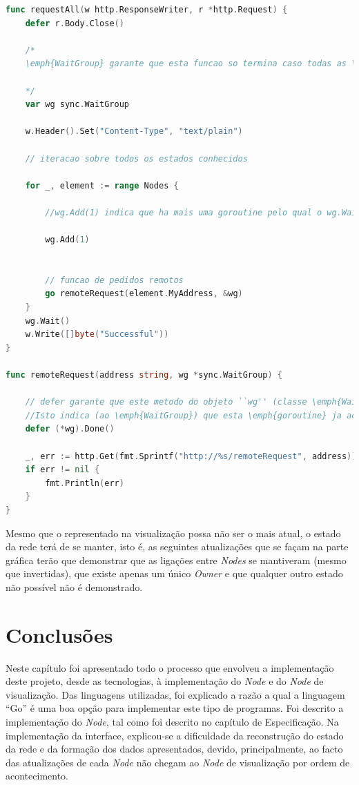 \begin{lstlisting}[caption={\emph{Handler} ``requestAll'' do método ``/requestAll''},language=Go]
func requestAll(w http.ResponseWriter, r *http.Request) {
	defer r.Body.Close()

	/* 
	\emph{WaitGroup} garante que esta funcao so termina caso todas as \emph{goroutines} terminem de executar.

	*/
	var wg sync.WaitGroup

	w.Header().Set("Content-Type", "text/plain")

	// iteracao sobre todos os estados conhecidos

	for _, element := range Nodes {

		//wg.Add(1) indica que ha mais uma goroutine pelo qual o wg.Wait() precisa de esperar

		wg.Add(1)


		// funcao de pedidos remotos
		go remoteRequest(element.MyAddress, &wg)
	}
	wg.Wait()
	w.Write([]byte("Successful"))
}

func remoteRequest(address string, wg *sync.WaitGroup) {

	// defer garante que este metodo do objeto ``wg'' (classe \emph{WaitGroup}) e executado
	//Isto indica (ao \emph{WaitGroup}) que esta \emph{goroutine} ja acabou a execucao
	defer (*wg).Done()

	_, err := http.Get(fmt.Sprintf("http://%s/remoteRequest", address))
	if err != nil {
		fmt.Println(err)
	}
}

\end{lstlisting}

Mesmo que o representado na visualização possa não ser o mais atual, o estado da rede terá de se manter, isto é, as seguintes 
atualizações que se façam na parte gráfica terão que demonstrar que as ligações entre \emph{Nodes} se mantiveram (mesmo que invertidas), que existe apenas um único \emph{Owner} e que qualquer outro estado não possível não é demonstrado.




\section{Conclusões}

Neste capítulo foi apresentado todo o processo que envolveu a implementação deste projeto, desde as tecnologias, à implementação do \emph{Node} e do \emph{Node} de visualização.
Das linguagens utilizadas, foi explicado a razão a qual a linguagem ``Go'' é uma boa opção para implementar este tipo de programas. Foi descrito a implementação do \emph{Node}, tal como foi descrito no capítulo de Especificação. 
Na implementação da interface, explicou-se a dificuldade da reconstrução do estado da rede e da formação dos dados apresentados, devido, principalmente, ao facto das atualizações de cada \emph{Node} não chegam ao \emph{Node} de visualização por ordem de acontecimento. 


